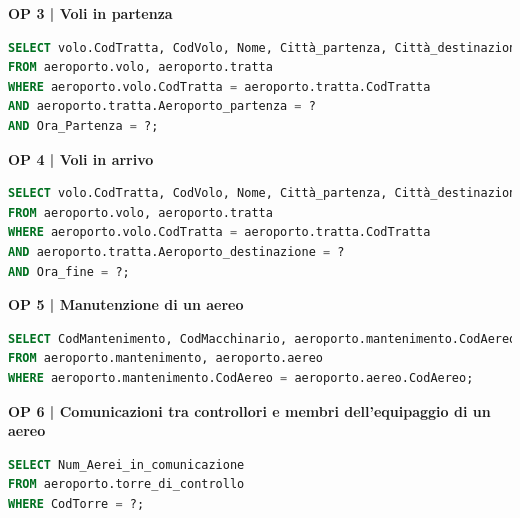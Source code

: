
\textbf{\small OP 3 | Voli in partenza}\\

\begin{lstlisting}[language=SQL]
SELECT volo.CodTratta, CodVolo, Nome, Città_partenza, Città_destinazione, Aeroporto_partenza, Aeroporto_destinazione, Ora_partenza, Ora_fine
FROM aeroporto.volo, aeroporto.tratta 
WHERE aeroporto.volo.CodTratta = aeroporto.tratta.CodTratta
AND aeroporto.tratta.Aeroporto_partenza = ?
AND Ora_Partenza = ?;
\end{lstlisting}


\textbf{\small OP 4 | Voli in arrivo}\\

\begin{lstlisting}[language=SQL]
SELECT volo.CodTratta, CodVolo, Nome, Città_partenza, Città_destinazione, Aeroporto_partenza, Aeroporto_destinazione, Ora_partenza, Ora_fine
FROM aeroporto.volo, aeroporto.tratta
WHERE aeroporto.volo.CodTratta = aeroporto.tratta.CodTratta
AND aeroporto.tratta.Aeroporto_destinazione = ?
AND Ora_fine = ?;	
\end{lstlisting}


\textbf{\small OP 5 | Manutenzione di un aereo}\\

\begin{lstlisting}[language=SQL]
SELECT CodMantenimento, CodMacchinario, aeroporto.mantenimento.CodAereo
FROM aeroporto.mantenimento, aeroporto.aereo
WHERE aeroporto.mantenimento.CodAereo = aeroporto.aereo.CodAereo;	
\end{lstlisting}


\textbf{\small OP 6 | Comunicazioni tra controllori e membri dell'equipaggio di un aereo}\\

\begin{lstlisting}[language=SQL]
SELECT Num_Aerei_in_comunicazione
FROM aeroporto.torre_di_controllo
WHERE CodTorre = ?; 	
\end{lstlisting}



